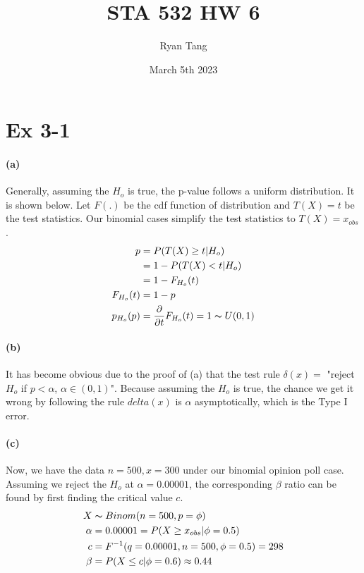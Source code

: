 \documentclass[11pt, letterpaper]{article}
\author{Ryan Tang}
\title{STA 532 HW 6}
\date{March 5th 2023}
\begin{document}
\maketitle

\section{Ex 3-1}
\paragraph{(a)}
Generally, assuming the $H_o$ is true, the p-value follows a uniform distribution. It is shown below. Let $F(.)$ be the cdf function of distribution and $T(X) = t$ be the test statistics. Our binomial cases simplify the test statistics to $T(X) = x_{obs}$.
\begin{align*}
    p &= P(T(X) \ge t | H_o) \\
        &= 1 - P(T(X) < t | H_o) \\
        &= 1 - F_{H_o}(t) \\
    F_{H_o}(t) &= 1 - p \\
    p_{H_o}(p) &= \frac{\partial}{\partial t} F_{H_o}(t) = 1 \thicksim U(0, 1)
\end{align*}

\paragraph{(b)}
It has become obvious due to the proof of (a) that the test rule $\delta(x) = $ "reject $H_o$ if $p < \alpha$, $\alpha \in (0, 1)$". Because assuming the $H_o$ is true, the chance we get it wrong by following the rule $delta(x)$ is $\alpha$ asymptotically, which is the Type I error.

\paragraph{(c)}
Now, we have the data $n=500, x = 300$ under our binomial opinion poll case. Assuming we reject the $H_o$ at $\alpha = 0.00001$, the corresponding $\beta$ ratio can be found by first finding the critical value $c$.
\begin{align*}
    X &\thicksim Binom(n=500, p=\phi) \\
    \alpha &= 0.00001 = P(X \ge x_{obs} | \phi = 0.5) \\
    c &= F^{-1}(q=0.00001, n=500, \phi=0.5) = 298 \\
    \beta &= P(X \le c | \phi = 0.6) \approx 0.44
\end{align*}
\end{document}

